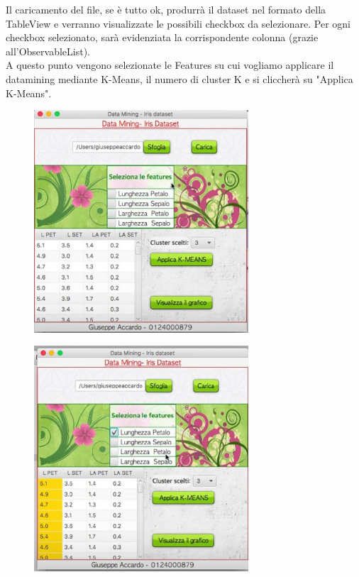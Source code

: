 \documentclass[a4paper, oneside]{book}
\begin{document}
\newpage
Il caricamento del file, se è tutto ok, produrrà il dataset nel formato della TableView e verranno visualizzate le possibili checkbox da selezionare. Per ogni checkbox selezionato, sarà evidenziata la corrispondente colonna (grazie all'ObservableList).\\
A questo punto vengono selezionate le Features su cui vogliamo applicare il datamining mediante K-Means, il numero di cluster K e si cliccherà su "Applica K-Means".
\begin{figure}[htp]
\centering
\includegraphics[width=8cm]{5.bmp}
\end{figure}


\begin{figure}[htp]
\centering
\includegraphics[width=8cm]{6.bmp}
\end{figure}
\end{document}
